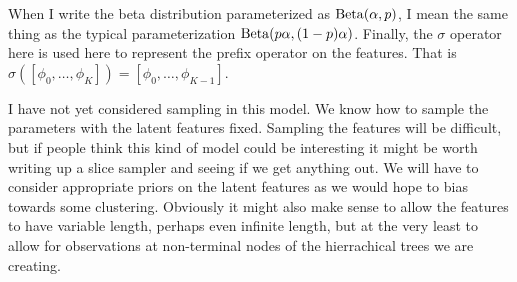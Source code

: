 \documentclass[11pt]{article}
\begin{document}
When I write the beta distribution parameterized as ${\rm Beta}(\alpha, p)$, I mean the same thing as the typical parameterization ${\rm Beta}(p\alpha, (1-p)\alpha)$.  Finally, the $\sigma$ operator here is used here to represent the prefix operator on the features.  That is $\sigma([\phi_0, \ldots, \phi_{K}]) = [\phi_0, \ldots, \phi_{K-1}]$.

I have not yet considered sampling in this model.  We know how to sample the parameters with the latent features fixed.  Sampling the features will be difficult, but if people think this kind of model could be interesting it might be worth writing up a slice sampler and seeing if we get anything out.  We will have to consider appropriate priors on the latent features as we would hope to bias towards some clustering.  Obviously it might also make sense to allow the features to have variable length, perhaps even infinite length, but at the very least to allow for observations at non-terminal nodes of the hierrachical trees we are creating.
\end{document}
